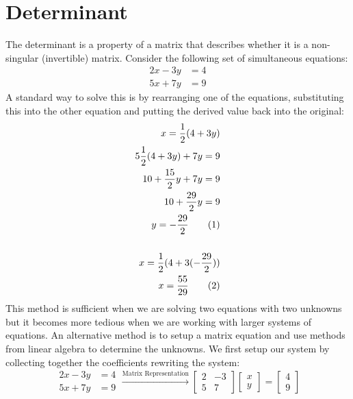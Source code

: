 \documentclass[a4paper,12pt]{book}
\newcommand{\nexteq}{\refstepcounter{equation}\theequation}
\begin{document}
	\section{Determinant}
	The determinant is a property of a matrix that describes whether it is a non-singular (invertible) matrix. Consider the following set of simultaneous equations: 
	\begin{align}
		2x - 3y &= 4 \\
		5x + 7y &= 9
	\end{align}	
	A standard way to solve this is by rearranging one of the equations, substituting this into the other equation and putting the derived value back into the original:	
	\begin{align*}
		x = \frac{1}{2} (4 + 3y) \\
		5\frac{1}{2}(4 + 3y) + 7y = 9 \\
		10 + \frac{15}{2} y + 7y = 9 \\
		10 + \frac{29}{2} y = 9 \\
		y = - \frac{29}{2} \tag{\nexteq} \\ 
		\\
		x = \frac{1}{2}(4 + 3(- \frac{29}{2})) \\
		x = \frac{55}{29} \tag{\nexteq}
	\end{align*}
	This method is sufficient when we are solving two equations with two unknowns but it becomes more tedious when we are working with larger systems of equations. An alternative method is to setup a matrix equation and use methods from linear algebra to determine the unknowns. We first setup our system by collecting together the coefficients rewriting the system: 
	\begin{equation}
		\begin{aligned}
			2x - 3y &= 4 \\
			5x + 7y &= 9
		\end{aligned}
		\xrightarrow{\text{Matrix Representation}}
		\begin{bmatrix}
			2 & -3 \\
			5 & 7 
		\end{bmatrix}
		\begin{bmatrix}
			x \\
			y
		\end{bmatrix}
		=
		\begin{bmatrix}
			4 \\
			9
		\end{bmatrix}
	\end{equation}
	
\end{document}
